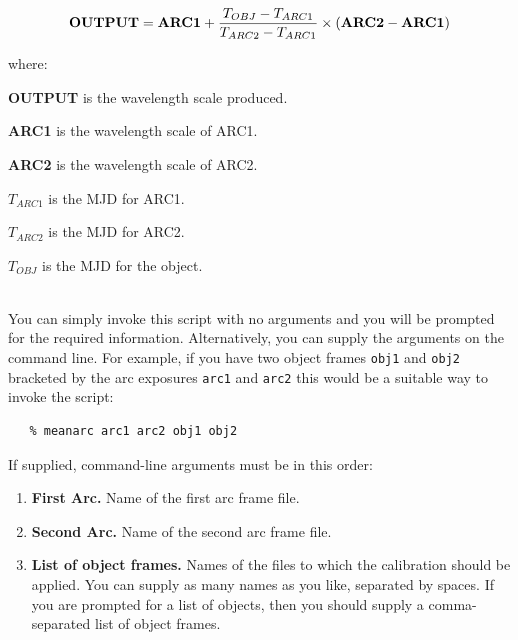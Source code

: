 \documentclass[twoside,11pt]{article}
\begin{document}
\begin{description}
\begin{displaymath}
   {\bf{OUTPUT}} = {\bf{ARC1}} + \frac{T_{OBJ} - T_{ARC1}}
                   {T_{ARC2} - T_{ARC1}} \times
                   ({\bf{ARC2}} - {\bf{ARC1}})
\end{displaymath}

     where:

\begin{description}

\item {\bf OUTPUT} is the wavelength scale produced.
\item {\bf ARC1}   is the wavelength scale of ARC1.
\item {\bf ARC2}   is the wavelength scale of ARC2.
\item $T_{ARC1}$  is the MJD for ARC1.
\item $T_{ARC2}$  is the MJD for ARC2.
\item $T_{OBJ}$   is the MJD for the object.

\end{description}

\item [{\bf Usage:}] \mbox{} \\
     You can simply invoke this script with no arguments and you
     will be prompted for the required information.  Alternatively,
     you can supply the arguments on the command line.  For example,
     if you have two object frames \verb+obj1+ and \verb+obj2+ bracketed
     by the arc exposures \verb+arc1+ and \verb+arc2+ this would be a
     suitable way to invoke the script:

\begin{verbatim}
   % meanarc arc1 arc2 obj1 obj2
\end{verbatim}

     If supplied, command-line arguments must be in this order:

\begin{enumerate}

\item {\bf First Arc.}
      Name of the first arc frame file.

\item {\bf Second Arc.}
      Name of the second arc frame file.

\item {\bf List of object frames.}
      Names of the files to which the calibration should be applied.
      You can supply as many names as you like, separated by spaces.
      If you are prompted for a list of objects, then you should
      supply a comma-separated list of object frames.


\end{enumerate}
\end{description}
\end{document}
